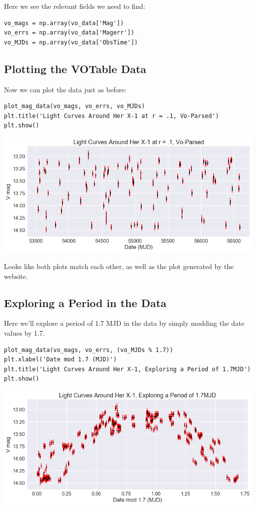 \documentclass[11pt]{article}
\begin{document}
Here we see the relevant fields we need to find:

\begin{verbatim}
vo_mags = np.array(vo_data['Mag'])
vo_errs = np.array(vo_data['Magerr'])
vo_MJDs = np.array(vo_data['ObsTime'])
\end{verbatim}

\subsection*{Plotting the VOTable Data}
\label{sec-5-1}

Now we can plot the data just as before:

\begin{verbatim}
plot_mag_data(vo_mags, vo_errs, vo_MJDs)
plt.title('Light Curves Around Her X-1 at r = .1, Vo-Parsed')
plt.show()
\end{verbatim}

\includegraphics[width=.9\linewidth]{./obipy-resources/17087XX1.png}



Looks like both plots match each other, as well as the plot generated by the website.

\subsection*{Exploring a Period in the Data}
\label{sec-5-2}

Here we'll explore a period of 1.7 MJD in the data by simply modding the date values by 1.7.

\begin{verbatim}
plot_mag_data(vo_mags, vo_errs, (vo_MJDs % 1.7))
plt.xlabel('Date mod 1.7 (MJD)')
plt.title('Light Curves Around Her X-1, Exploring a Period of 1.7MJD')
plt.show()
\end{verbatim}

\includegraphics[width=.9\linewidth]{./obipy-resources/17087w_W.png}
\end{document}
